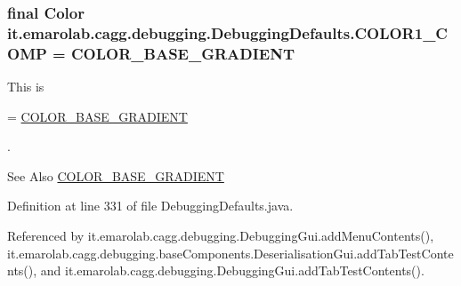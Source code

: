 \hypertarget{classit_1_1emarolab_1_1cagg_1_1debugging_1_1DebuggingDefaults_a32f81a64fecaefa7a86090eb6ecbbb77}{
\subsubsection[{C\-O\-L\-O\-R1\-\_\-\-C\-O\-M\-P}]{\setlength{\rightskip}{0pt plus 5cm}final Color it.\-emarolab.\-cagg.\-debugging.\-Debugging\-Defaults.\-C\-O\-L\-O\-R1\-\_\-\-C\-O\-M\-P = {\bf C\-O\-L\-O\-R\-\_\-\-B\-A\-S\-E\-\_\-\-G\-R\-A\-D\-I\-E\-N\-T}\hspace{0.3cm}{\ttfamily [static]}}}\label{classit_1_1emarolab_1_1cagg_1_1debugging_1_1DebuggingDefaults_a32f81a64fecaefa7a86090eb6ecbbb77}
This is
\begin{DoxyCode}
= \hyperlink{classit_1_1emarolab_1_1cagg_1_1debugging_1_1DebuggingDefaults_a17491ab8ed655381e8f8cc34e9d3b670}{COLOR\_BASE\_GRADIENT} 
\end{DoxyCode}
 . \begin{DoxySeeAlso}{See Also}
\hyperlink{classit_1_1emarolab_1_1cagg_1_1debugging_1_1DebuggingDefaults_a17491ab8ed655381e8f8cc34e9d3b670}{C\-O\-L\-O\-R\-\_\-\-B\-A\-S\-E\-\_\-\-G\-R\-A\-D\-I\-E\-N\-T} 
\end{DoxySeeAlso}


Definition at line 331 of file Debugging\-Defaults.\-java.



Referenced by it.\-emarolab.\-cagg.\-debugging.\-Debugging\-Gui.\-add\-Menu\-Contents(), it.\-emarolab.\-cagg.\-debugging.\-base\-Components.\-Deserialisation\-Gui.\-add\-Tab\-Test\-Contents(), and it.\-emarolab.\-cagg.\-debugging.\-Debugging\-Gui.\-add\-Tab\-Test\-Contents().

